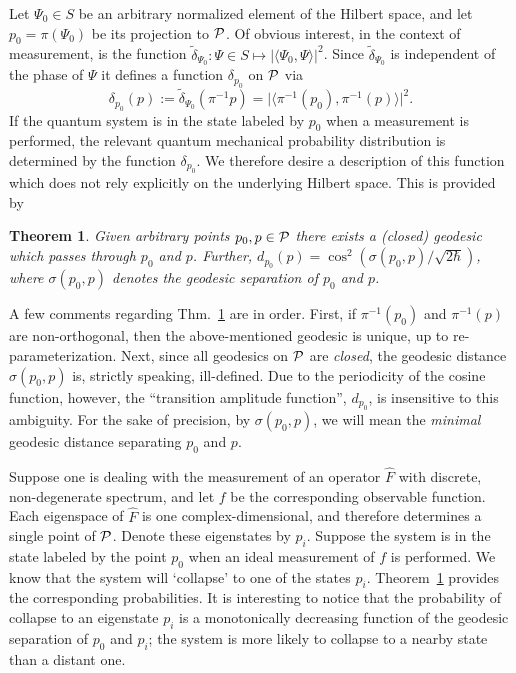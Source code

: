 \documentclass[12pt,aps,eqsecnum,tighten]{revtex4-2}
\newtheorem{theorem}{Theorem}[section]
\def\be{\begin{equation}}
\def\ee{\end{equation}}
\def\<{\langle}
\def\>{\rangle}
\def\P{{\cal P}}
\begin{document}
Let $\Psi_0 \in S$ be an arbitrary normalized element of the Hilbert
space, and let $p_0 = \pi(\Psi_0)$ be its projection to $\P$. Of
obvious interest, in the context of measurement, is the function
$\tilde{\delta}_{\Psi_0} :\Psi\in S \mapsto \big| \< \Psi_0 , \Psi \>
\big|^2$.  Since $\tilde{\delta}_{\Psi_0}$ is independent of the phase of
$\Psi$ it defines a function $\delta_{p_0}$ on $\P$ via
%
\be
\delta_{p_0}(p) := \tilde{\delta}_{\Psi_0} ( \pi^{-1}p )
= \big| \< \pi^{-1}(p_0),  \pi^{-1}(p) \> \big|^2.
\ee
%
If the quantum system is in the state labeled by $p_0$ when a
measurement is performed, the relevant quantum mechanical probability
distribution is determined by the function $\delta_{p_0}$.  We
therefore desire a description of this function which does not rely
explicitly on the underlying Hilbert space.  This is provided by
%
\begin{theorem}\label{thm_geodesics}
Given arbitrary points $p_0, p \in \P$ there exists a (closed)
geodesic which passes through $p_0$ and $p$. Further, $d_{p_0}(p) =
\cos^2\left( \sigma(p_0, p) / \sqrt{2\hbar} \right)$, where
$\sigma(p_0, p)$ denotes the geodesic separation of $p_0$ and $p$.
\end{theorem}

A few comments regarding Thm.~\ref{thm_geodesics} are in order.
First, if $\pi^{-1}(p_0)$ and $\pi^{-1}(p)$ are non-orthogonal, then
the above-mentioned geodesic is unique, up to re-parameterization.
Next, since all geodesics on $\P$ are {\em closed}, the geodesic
distance $\sigma(p_0, p)$ is, strictly speaking, ill-defined.  Due to
the periodicity of the cosine function, however, the ``transition
amplitude function'', $d_{p_0}$, is insensitive to this ambiguity.
For the sake of precision, by $\sigma(p_0, p)$, we will mean the {\em
minimal} geodesic distance separating $p_0$ and $p$.

Suppose one is dealing with the measurement of an operator $\hat{F}$
with discrete, non-degenerate spectrum, and let $f$ be the
corresponding observable function.  Each eigenspace of $\hat{F}$ is
one complex-dimensional, and therefore determines a single point of
 $\P$.  Denote these eigenstates by $p_i$.  Suppose the system is in
the state labeled by the point $p_0$ when an ideal measurement of $f$
is performed.  We know that the system will `collapse' to one of the
states $p_i$.  Theorem~\ref{thm_geodesics} provides the corresponding
probabilities.  It is interesting to notice that the probability of
collapse to an eigenstate $p_i$ is a monotonically decreasing function
of the geodesic separation of $p_0$ and $p_i$; the system is more
likely to collapse to a nearby state than a distant one.
\end{document}
